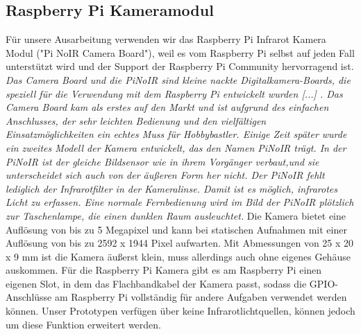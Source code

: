 \documentclass[journal]{IEEEtran}
\begin{document}
\subsection{Raspberry Pi Kameramodul}
Für unsere Ausarbeitung verwenden wir das Raspberry Pi Infrarot Kamera Modul ("Pi NoIR Camera Board"), weil es vom Raspberry Pi selbst auf jeden Fall unterstützt wird und der Support der Raspberry Pi Community hervorragend ist. \textit{Das Camera Board und die PiNoIR sind kleine nackte Digitalkamera-Boards, die speziell für die Verwendung mit dem Raspberry Pi entwickelt wurden [...] . Das Camera Board kam als erstes auf den Markt und ist aufgrund des einfachen Anschlusses, der sehr leichten Bedienung und den vielfältigen Einsatzmöglichkeiten ein echtes Muss für Hobbybastler. Einige Zeit später wurde ein zweites Modell der Kamera entwickelt, das den Namen PiNoIR trägt. In der PiNoIR ist der gleiche Bildsensor wie in ihrem Vorgänger verbaut,und sie unterscheidet sich auch von der äußeren Form her nicht. Der PiNoIR fehlt lediglich der Infrarotfilter in der Kameralinse. Damit ist es möglich, infrarotes Licht zu erfassen. Eine normale Fernbedienung wird im Bild der PiNoIR plötzlich zur Taschenlampe, die einen dunklen Raum ausleuchtet.}\cite[S. 511]{raspi} Die Kamera bietet eine Auflösung von bis zu 5 Megapixel und kann bei statischen Aufnahmen mit einer Auflösung von bis zu 2592 x 1944 Pixel aufwarten. Mit Abmessungen von 25 x 20 x 9 mm ist die Kamera äußerst klein, muss allerdings auch ohne eigenes Gehäuse auskommen. Für die Raspberry Pi Kamera gibt es am Raspberry Pi einen eigenen Slot, in dem das Flachbandkabel der Kamera passt, sodass die GPIO-Anschlüsse am Raspberry Pi vollständig für andere Aufgaben verwendet werden können. Unser Prototypen verfügen über keine Infrarotlichtquellen, können jedoch um diese Funktion erweitert werden. 
\end{document}
